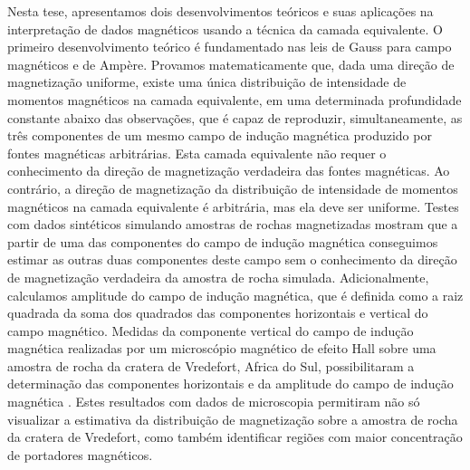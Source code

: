 Nesta tese, apresentamos dois desenvolvimentos teóricos e suas aplicações na interpretação de dados magnéticos usando a técnica da camada equivalente. 
O primeiro desenvolvimento teórico é fundamentado nas leis de Gauss para campo magnéticos e de Ampère. Provamos matematicamente que, dada uma direção de magnetização uniforme, existe uma única distribuição de intensidade de momentos magnéticos na camada equivalente, em uma determinada profundidade constante abaixo das observações, que é capaz de reproduzir, simultaneamente, as três componentes de um mesmo campo de indução 
magnética produzido por fontes magnéticas arbitrárias. Esta camada equivalente não requer o conhecimento da direção de magnetização verdadeira das fontes magnéticas. Ao contrário, a direção de magnetização da distribuição de intensidade de momentos magnéticos na camada equivalente é arbitrária, mas ela deve ser uniforme. 
Testes com dados sintéticos simulando amostras de rochas magnetizadas mostram que a partir de uma das componentes do campo de indução magnética conseguimos estimar as outras duas componentes deste campo sem o conhecimento da direção de magnetização verdadeira da amostra de rocha simulada. Adicionalmente, calculamos amplitude do campo de indução magnética, que é definida como a raiz quadrada da soma dos quadrados das 
componentes horizontais e vertical do campo magnético. Medidas da componente vertical do campo de indução magnética realizadas por um microscópio magnético de efeito Hall sobre uma amostra de rocha da cratera de Vredefort, Africa do Sul, possibilitaram a determinação das componentes horizontais e da amplitude do campo de indução magnética \citep{araujo_etal2019_materials}. Estes resultados com dados de microscopia permitiram não só visualizar a estimativa da distribuição de magnetização sobre a amostra de rocha da cratera de Vredefort, como também identificar regiões com maior concentração de portadores magnéticos.

